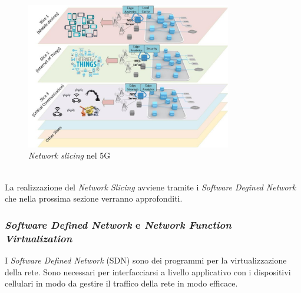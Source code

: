 \begin{figure}[ht]
    \centering
    \includegraphics[width=0.8\textwidth]{images/5g-slicing.jpg}
    \caption{\textit{Network slicing} nel 5G}
\end{figure}\\
La realizzazione del \textit{Network Slicing} avviene tramite i \textit{Software Degined Network} che nella prossima sezione verranno approfonditi.
\subsubsection{\textit{Software Defined Network} e  \textit{Network Function Virtualization}}
I \textit{Software Defined Network} (SDN) sono dei programmi per la virtualizzazione della rete. Sono necessari per interfacciarsi a livello applicativo con i dispositivi cellulari 
in modo da gestire il traffico della rete in modo efficace\cite{5g-sdn}.